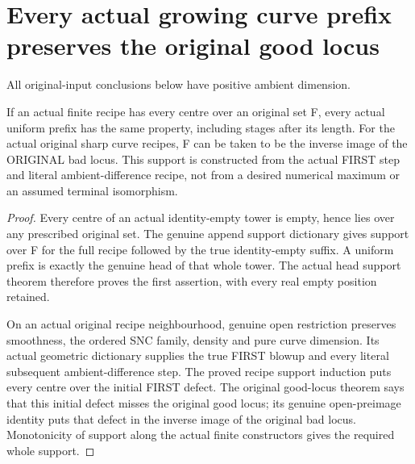 \section{Every actual growing curve prefix preserves the original good locus}

All original-input conclusions below have positive ambient dimension.

\begin{lemma}
\label{hir:sharp-actual-curve-uniform-prefix-centre-support}
\leanok
If an actual finite recipe has every centre over an original set F, every
actual uniform prefix has the same property, including stages after its
length. For the actual original sharp curve recipes, F can be taken to be
the inverse image of the ORIGINAL bad locus. This support is constructed
from the actual FIRST step and literal ambient-difference recipe, not
from a desired numerical maximum or an assumed terminal isomorphism.
\end{lemma}
\begin{proof}
Every centre of an actual identity-empty tower is empty, hence lies over
any prescribed original set. The genuine append support dictionary gives
support over F for the full recipe followed by the true identity-empty
suffix. A uniform prefix is exactly the genuine head of that whole tower.
The actual head support theorem therefore proves the first assertion,
with every real empty position retained.

On an actual original recipe neighbourhood, genuine open restriction
preserves smoothness, the ordered SNC family, density and pure curve
dimension. Its actual geometric dictionary supplies the true FIRST
blowup and every literal subsequent ambient-difference step. The proved
recipe support induction puts every centre over the initial FIRST defect.
The original good-locus theorem says that this initial defect misses the
original good locus; its genuine open-preimage identity puts that defect
in the inverse image of the original bad locus. Monotonicity of support
along the actual finite constructors gives the required whole support.
\end{proof}

